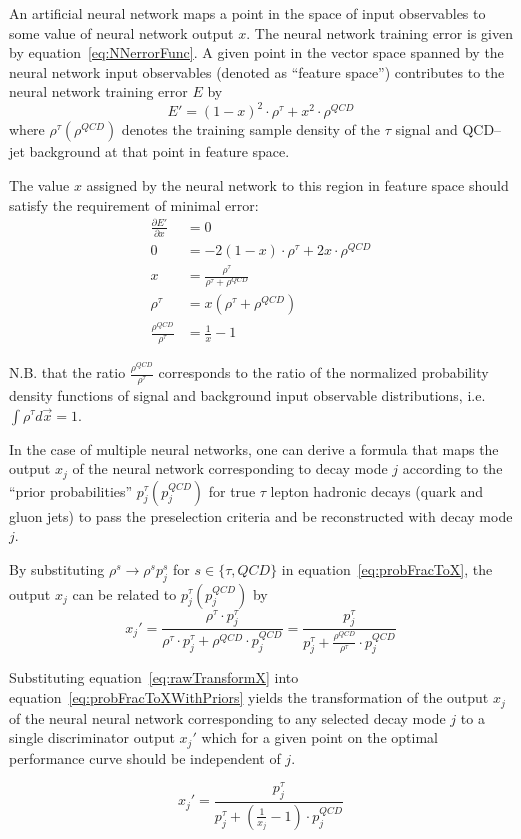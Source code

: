 An artificial neural network maps a point in the space of input observables to
some value of neural network output $x$.  The neural network training error is
given by equation~\ref{eq:NNerrorFunc}.  A given point in the vector space
spanned by the neural network input observables (denoted as ``feature space'')
contributes to the neural network training error $E$ by 
\begin{equation}
   E' = (1 - x)^2\cdot\rho^\tau + x^2\cdot\rho^{QCD}
\end{equation}
where $\rho^\tau (\rho^{QCD})$ denotes the training sample density of the
$\tau$ signal and QCD--jet background at that point in feature space.

The value $x$ assigned by the neural network to this region in feature space
should satisfy the requirement of minimal error:
\begin{align}
   \frac{\partial E'}{\partial x} &= 0 \nonumber \\ 
   0 &= -2(1-x)\cdot\rho^\tau+2x\cdot\rho^{QCD} \nonumber \\ 
   x &= \frac{\rho^\tau} {\rho^\tau + \rho^{QCD}} \label{eq:probFracToX} \\ 
   \rho^\tau &= x(\rho^\tau + \rho^{QCD}) \nonumber \\ 
   \frac{\rho^{QCD}}{\rho^\tau} &= \frac{1}{x} - 1  \label{eq:rawTransformX}
\end{align}

N.B. that the ratio $\frac{\rho^{QCD}}{\rho^\tau}$ corresponds to the ratio of
the normalized probability density functions of signal and background input
observable distributions, i.e. $\int \rho^{\tau} d\vec x = 1$.

In the case of multiple neural networks, one can derive a formula that maps the
output $x_j$ of the neural network corresponding to decay mode $j$ according to
the ``prior probabilities'' $p_j^\tau (p_j^{QCD})$ for true $\tau$ lepton
hadronic decays (quark and gluon jets) to pass the preselection criteria and
be reconstructed with decay mode $j$.

By substituting $\rho^s \rightarrow \rho^s p_j^s$ for $s \in \{\tau, QCD\}$ in
equation~\ref{eq:probFracToX}, the output $x_j$ can be related to $p_j^\tau
(p_j^{QCD})$ by 
\begin{equation}
   x_j' = \frac{\rho^\tau \cdot p_j^\tau} 
   {\rho^\tau \cdot p_j^\tau + \rho^{QCD} \cdot p_j^{QCD} }
   = \frac{p_j^\tau} 
   {p_j^\tau + \frac{\rho^{QCD}}{\rho^\tau} \cdot p_j^{QCD} }
   \label{eq:probFracToXWithPriors}
\end{equation}

Substituting equation~\ref{eq:rawTransformX} into
equation~\ref{eq:probFracToXWithPriors} yields the transformation of the output
$x_j$ of the neural neural network corresponding to any selected decay mode $j$
to a single discriminator output $x_j'$ which for a given point on the optimal
performance curve should be independent of $j$.

\begin{equation}
   x_j' = \frac{p_j^\tau} 
   {p_j^\tau + \left(\frac{1}{x_j}-1\right)\cdot p_j^{QCD} }
\end{equation}


